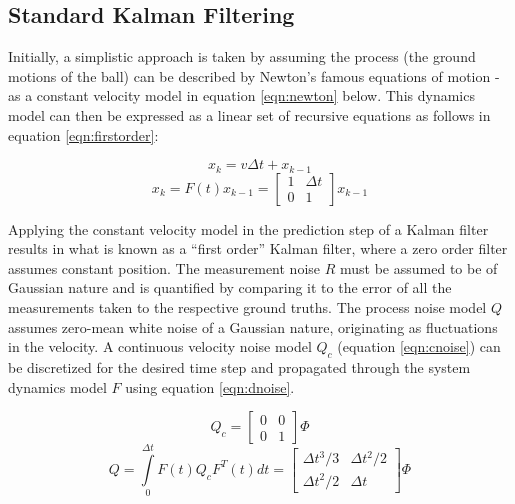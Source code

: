 \documentclass[a4paper,twoside,12pt]{report}
\begin{document}
\subsection{Standard Kalman Filtering}

Initially, a simplistic approach is taken by assuming the process (the ground motions of the ball) can be described by Newton's famous equations of motion - as a constant velocity model in equation \ref{eqn:newton} below. This dynamics model can then be expressed as a linear set of recursive equations as follows in equation \ref{eqn:firstorder}:

\begin{equation} 
x_k=v\Delta t + x_{k-1}
\label{eqn:newton}
\end{equation}
\begin{equation} 
x_k
=
F(t)x_{k-1}
=
\begin{bmatrix}
    1 & \Delta t \\
    0 & 1 
\end{bmatrix}
x_{k-1}
\label{eqn:firstorder}
\end{equation}

Applying the constant velocity model in the prediction step of a Kalman filter results in what is known as a ``first order'' Kalman filter, where a zero order filter assumes constant position. The measurement noise $R$ must be assumed to be of Gaussian nature and is quantified by comparing it to the error of all the measurements taken to the respective ground truths. The process noise model $Q$ assumes zero-mean white noise of a Gaussian nature, originating as fluctuations in the velocity. A continuous velocity noise model $Q_c$ (equation \ref{eqn:cnoise}) can be discretized for the desired time step and propagated through the system dynamics model $F$ using equation \ref{eqn:dnoise}. \citep{kalmanpy}

\begin{equation} 
Q_c
=
\begin{bmatrix}
    0 & 0 \\
    0 & 1 
\end{bmatrix}
\Phi
\label{eqn:cnoise}
\end{equation}
\begin{equation} 
Q = \int\limits_0^{\Delta t} F(t)Q_cF^T(t)dt
=
\begin{bmatrix}
    \Delta t^3/3 & \Delta t^2/2 \\
    \Delta t^2/2 & \Delta t 
\end{bmatrix}
\Phi
\label{eqn:dnoise}
\end{equation}
\end{document}

